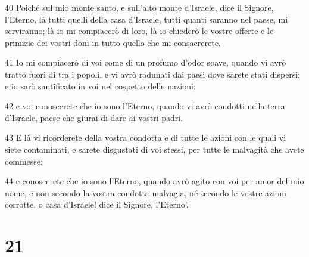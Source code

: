 \par 40 Poiché sul mio monte santo, e sull'alto monte d'Israele, dice il Signore, l'Eterno, là tutti quelli della casa d'Israele, tutti quanti saranno nel paese, mi serviranno; là io mi compiacerò di loro, là io chiederò le vostre offerte e le primizie dei vostri doni in tutto quello che mi consacrerete.
\par 41 Io mi compiacerò di voi come di un profumo d'odor soave, quando vi avrò tratto fuori di tra i popoli, e vi avrò radunati dai paesi dove sarete stati dispersi; e io sarò santificato in voi nel cospetto delle nazioni;
\par 42 e voi conoscerete che io sono l'Eterno, quando vi avrò condotti nella terra d'Israele, paese che giurai di dare ai vostri padri.
\par 43 E là vi ricorderete della vostra condotta e di tutte le azioni con le quali vi siete contaminati, e sarete disgustati di voi stessi, per tutte le malvagità che avete commesse;
\par 44 e conoscerete che io sono l'Eterno, quando avrò agito con voi per amor del mio nome, e non secondo la vostra condotta malvagia, né secondo le vostre azioni corrotte, o casa d'Israele! dice il Signore, l'Eterno'.

\chapter{21}

